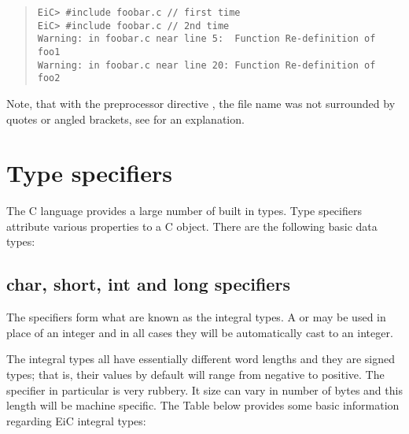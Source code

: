 \begin{quote}
\begin{verbatim}
EiC> #include foobar.c // first time
EiC> #include foobar.c // 2nd time
Warning: in foobar.c near line 5:  Function Re-definition of foo1
Warning: in foobar.c near line 20: Function Re-definition of foo2
\end{verbatim}
\end{quote}

Note, that with the preprocessor directive , the file
name was not surrounded by quotes or angled brackets, see
 for an explanation.


\section{Type specifiers}
\label{sec:TypeSpecifiers}
The C language provides a large number of built in types. Type
specifiers attribute various properties to a C object. There are the
following basic data types:
\begin{production}
\end{production}

\subsection{char, short, int and long specifiers}
The  specifiers form 
what are known as the integral types.
A  or  may be used in place of an integer
and in all cases they will be automatically cast to an integer.

The integral types all have essentially different word lengths and
they are signed types; that is, their values by default will range
from negative to positive. The  specifier in particular is very
rubbery. It size can vary in number of bytes and this length will be
machine specific. The Table below provides some basic information
regarding EiC integral types:

